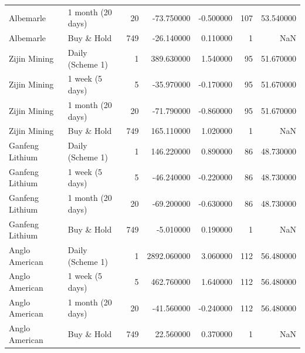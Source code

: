 \begin{longtable}{llrrrrr}
Albemarle & 1 month (20 days) & 20 & -73.750000 & -0.500000 & 107 & 53.540000 \\
Albemarle & Buy \& Hold & 749 & -26.140000 & 0.110000 & 1 & NaN \\
Zijin Mining & Daily (Scheme 1) & 1 & 389.630000 & 1.540000 & 95 & 51.670000 \\
Zijin Mining & 1 week (5 days) & 5 & -35.970000 & -0.170000 & 95 & 51.670000 \\
Zijin Mining & 1 month (20 days) & 20 & -71.790000 & -0.860000 & 95 & 51.670000 \\
Zijin Mining & Buy \& Hold & 749 & 165.110000 & 1.020000 & 1 & NaN \\
Ganfeng Lithium & Daily (Scheme 1) & 1 & 146.220000 & 0.890000 & 86 & 48.730000 \\
Ganfeng Lithium & 1 week (5 days) & 5 & -46.240000 & -0.220000 & 86 & 48.730000 \\
Ganfeng Lithium & 1 month (20 days) & 20 & -69.200000 & -0.630000 & 86 & 48.730000 \\
Ganfeng Lithium & Buy \& Hold & 749 & -5.010000 & 0.190000 & 1 & NaN \\
Anglo American & Daily (Scheme 1) & 1 & 2892.060000 & 3.060000 & 112 & 56.480000 \\
Anglo American & 1 week (5 days) & 5 & 462.760000 & 1.640000 & 112 & 56.480000 \\
Anglo American & 1 month (20 days) & 20 & -41.560000 & -0.240000 & 112 & 56.480000 \\
Anglo American & Buy \& Hold & 749 & 22.560000 & 0.370000 & 1 & NaN \\
\end{longtable}
